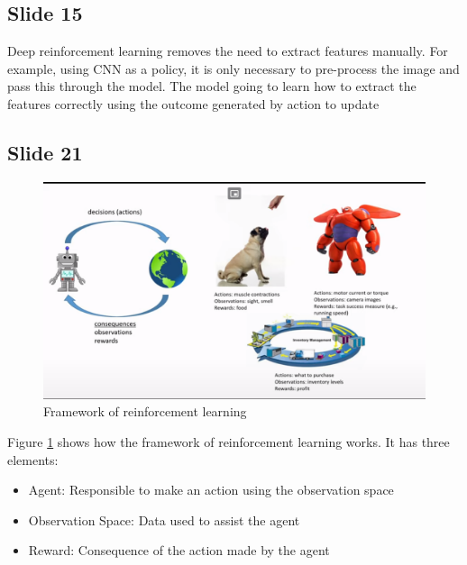 \documentclass{article}
\begin{document}
\subsection*{Slide 15}
\par 
Deep reinforcement learning removes the need to extract features manually. For example, using CNN as a policy, it is only necessary to pre-process the image and pass this through the model. The model going to learn how to
extract the features correctly using the outcome generated by action to update


\subsection*{Slide 21}

\begin{figure}
    \centering
    \includegraphics[scale=0.4]{cap1img/slide21.png}
    \caption{Framework of reinforcement learning}
    \label{fig:slide21}
\end{figure}

\par Figure \ref{fig:slide21} shows how the framework of reinforcement learning works. It has three elements:
\begin{itemize}
    \item Agent: Responsible to make an action using the observation space
    \item Observation Space: Data used to assist the agent
    \item Reward: Consequence of the action made by the agent
\end{itemize}
\end{document}
